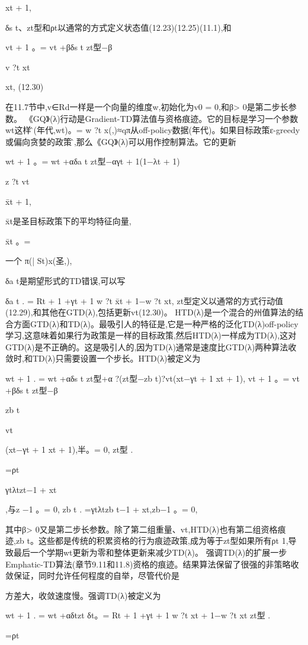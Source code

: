 xt + 1,

δs t、zt型和ρt以通常的方式定义状态值(12.23)(12.25)(11.1),和

vt + 1
。= vt +βδs t zt型−β

v ?t xt

xt, 					(12.30)

在11.7节中,v∈Rd一样是一个向量的维度w,初始化为v0 = 0,和β> 0是第二步长参数。
《GQ》(λ)行动是Gradient-TD算法值与资格痕迹。它的目标是学习一个参数wt这样问̂(年代,wt)。= w ?t x(,)≈qπ从off-policy数据(年代)。如果目标政策ε-greedy或偏向贪婪的政策问̂,那么《GQ》(λ)可以用作控制算法。它的更新

wt + 1
。= wt +αδa t zt型−αγt + 1(1−λt + 1)

z ?t vt

x̄t + 1,

x̄t是圣目标政策下的平均特征向量,


x̄t
。=

一个
π(| St)x(圣,),

δa t是期望形式的TD错误,可以写

δa t
.
= Rt + 1 +γt + 1 w ?t x̄t + 1−w ?t xt,
zt型定义以通常的方式行动值(12.29),和其他在GTD(λ),包括更新vt(12.30)。
HTD(λ)是一个混合的州值算法的结合方面GTD(λ)和TD(λ)。最吸引人的特征是,它是一种严格的泛化TD(λ)off-policy学习,这意味着如果行为政策是一样的目标政策,然后HTD(λ)一样成为TD(λ),这对GTD(λ)是不正确的。这是吸引人的,因为TD(λ)通常是速度比GTD(λ)两种算法收敛时,和TD(λ)只需要设置一个步长。HTD(λ)被定义为

wt + 1
.
= wt +αδs t zt型+α
?(zt型−zb t)?vt(xt−γt + 1 xt + 1),
vt + 1
。= vt +βδs t zt型−β

zb t

vt

(xt−γt + 1 xt + 1),半。= 0,
zt型
.

=ρt

γtλtzt−1 + xt

,与z
−1
。= 0,
zb t
.
=γtλtzb t−1 + xt,zb−1
。= 0,

其中β> 0又是第二步长参数。除了第二组重量、vt,HTD(λ)也有第二组资格痕迹,zb t。这些都是传统的积累资格的行为痕迹政策,成为等于zt型如果所有ρt 1,导致最后一个学期wt更新为零和整体更新来减少TD(λ)。
强调TD(λ)的扩展一步Emphatic-TD算法(章节9.11和11.8)资格的痕迹。结果算法保留了很强的非策略收敛保证，同时允许任何程度的自举，尽管代价是

方差大，收敛速度慢。强调TD(λ)被定义为

wt + 1
.
= wt +αδtzt
δt。= Rt + 1 +γt + 1 w ?t xt + 1−w ?t xt zt型
.

=ρt

